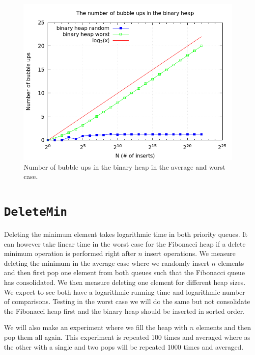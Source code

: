 \documentclass[a4paper,oneside,article,11pt]{memoir}
\begin{document}
\begin{figure}[H]
\centering
  \includegraphics[scale=0.5]{../res/inserts/insert_bubble_up.png}%
  \caption{Number of bubble ups in the binary heap in the average and worst case.}
  \label{fig:bubble_ups}
\end{figure}

\section{\texttt{DeleteMin}}
Deleting the minimum element takes logarithmic time in both priority queues. It can however take linear time in the worst case for the Fibonacci heap if a delete minimum operation is performed right after $n$ insert operations. We measure deleting the minimum in the average case where we randomly insert $n$ elements and then first pop one element from both queues such that the Fibonacci queue has consolidated. We then measure deleting one element for different heap sizes. We expect to see both have a logarithmic running time and logarithmic number of comparisons.
Testing in the worst case we will do the same but not consolidate the Fibonacci heap first and the binary heap should be inserted in sorted order.

We will also make an experiment where we fill the heap with $n$ elements and then pop them all again. This experiment is repeated 100 times and averaged where as the other with a single and two pops will be repeated 1000 times and averaged.
\end{document}
